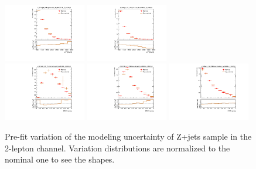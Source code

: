 \begin{figure}[H]
\begin{center}
 \includegraphics[width=0.32\textwidth,keepaspectratio]{figures/syst/Z_0ptag1pfat0pjet_0ptv_CRVjet_MTagMerJets_SysMODEL_Z_MGPy8_Norm.pdf}
 \includegraphics[width=0.32\textwidth,keepaspectratio]{figures/syst/Z_0ptag2pjet_0ptv_CRVjet_Fid_MTagResJets_SysMODEL_Z_MGPy8_Norm.pdf}
 \\
 \includegraphics[width=0.32\textwidth,keepaspectratio]{figures/syst/Z_0ptag1pfat0pjet_0ptv_SRVBS_HP_RNNScoreMerged_SysMODEL_Z_MGPy8_Norm.pdf}
 \includegraphics[width=0.32\textwidth,keepaspectratio]{figures/syst/Z_0ptag1pfat0pjet_0ptv_SRVBS_LP_RNNScoreMerged_SysMODEL_Z_MGPy8_Norm.pdf}
 \includegraphics[width=0.32\textwidth,keepaspectratio]{figures/syst/Z_0ptag2pjet_0ptv_SRVBS_Fid_RNNScoreResolved_SysMODEL_Z_MGPy8_Norm.pdf}
 \caption[f]{
Pre-fit variation of the modeling uncertainty of Z+jets sample in the 2-lepton channel.  Variation distributions are normalized to the nominal one to see the shapes.
}
\label{fig:modelingZ}
\end{center}
\end{figure}

